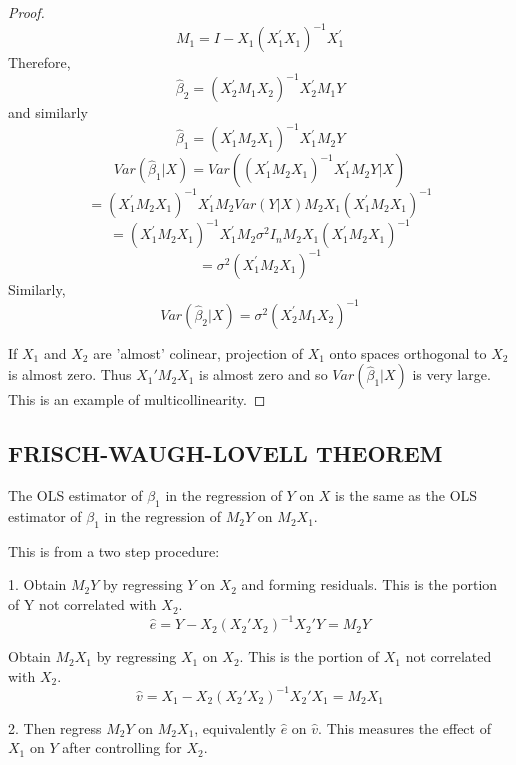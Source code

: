 \documentclass[DIV=14,titlepage=false]{scrreprt}
\begin{document}
\begin{proof}
\[
  M_{1} = I-X_{1}(X_{1}^{\prime}X_{1})^{-1}X_{1}^{\prime}
\]
Therefore,
\[
  \hat{\beta}_{2} = (X_{2}^{\prime}M_{1}X_{2})^{-1}X_{2}^{\prime}M_{1}Y
\]
and similarly
\[
  \hat{\beta}_{1} = (X_{1}^{\prime}M_{2}X_{1})^{-1}X_{1}^{\prime}M_{2}Y
\]
\[Var(\hat{\beta}_{1}|X) = Var((X_{1}^{\prime}M_{2}X_{1})^{-1}X_{1}^{\prime}M_{2}Y|X)\]
\[ = (X_{1}^{\prime}M_{2}X_{1})^{-1}X_{1}^{\prime}M_{2}Var(Y|X)M_{2}X_{1}(X_{1}^{\prime}M_{2}X_{1})^{-1}\]
\[ = (X_{1}^{\prime}M_{2}X_{1})^{-1}X_{1}^{\prime}M_{2}\sigma^{2}I_{n}M_{2}X_{1}(X_{1}^{\prime}M_{2}X_{1})^{-1}\]
\[ = \sigma^{2}(X_{1}^{\prime}M_{2}X_{1})^{-1}\]
Similarly,
\[Var(\hat{\beta}_{2}|X) = \sigma^{2}(X_{2}^{\prime}M_{1}X_{2})^{-1}\]

If \(X_1\) and \(X_2\) are 'almost' colinear, projection of \(X_1\) onto spaces orthogonal to \(X_2\) is almost zero. Thus \(X_1'M_2X_1\) is almost zero and so \(Var(\hat{\beta}_1|X)\) is very large. This is an example of multicollinearity.

  \end{proof}

\subsection{FRISCH-WAUGH-LOVELL THEOREM}

\vspace{5mm}

\begin{theorem}
  The OLS estimator of \(\beta_1\) in the regression of \(Y\) on \(X\) is the same as the OLS estimator of \(\beta_1\) in the regression of \(M_2Y\) on \(M_2X_1\).

  This is from a two step procedure:

  1. Obtain \(M_2Y\) by regressing \(Y\) on \(X_2\) and forming residuals. This is the portion of Y not correlated with \(X_2\).
  \[\hat{e}=Y-X_2(X_2'X_2)^{-1}X_2'Y=M_2Y\]

     \hspace{4.5mm}Obtain \(M_2X_1\) by regressing \(X_1\) on \(X_2\). This is the portion of \(X_1\) not correlated with \(X_2\).
  \[\hat{v}=X_1-X_2(X_2'X_2)^{-1}X_2'X_1=M_2X_1\]

  2. Then regress \(M_2Y\) on \(M_2X_1\), equivalently \(\hat{e}\) on \(\hat{v}\). This measures the 
  effect of \(X_1\) on \(Y\) after controlling for \(X_2\).
\end{theorem}

\vspace{5mm}
\end{document}
